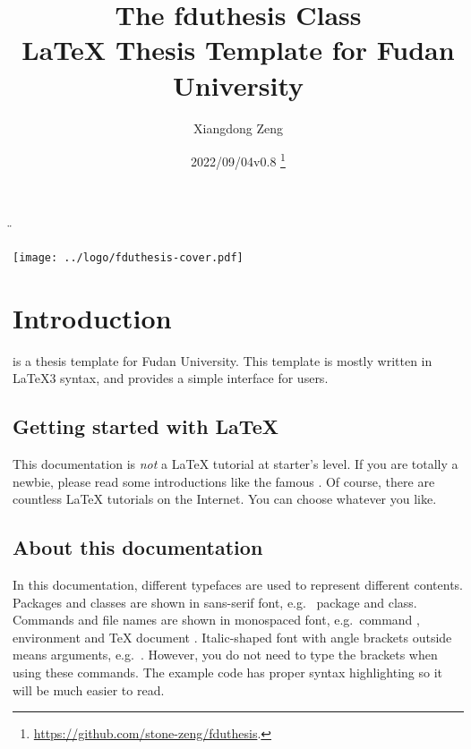 \documentclass{fdudoc}
\title{\textcolor{MaterialIndigo800}{%
  \textbf{The \textsf{fduthesis} Class \\
    \LaTeX{} Thesis Template for Fudan University}}}
\author{Xiangdong Zeng}
\date{2022/09/04\quad v0.8%
  \thanks{\url{https://github.com/stone-zeng/fduthesis}.}}
\begin{document}
\DeleteShortVerb\"


\maketitle
\vfill
\begin{center}
  \texttt{[image: ../logo/fduthesis-cover.pdf]}
\end{center}
\vfill
\thispagestyle{plain}
\clearpage

\tableofcontents


\section{Introduction}

 is a thesis template for Fudan University.
This template is mostly written in \LaTeX3 syntax, and
provides a simple interface for users.

\subsection*{Getting started with \LaTeX{}}

This documentation is \emph{not} a \LaTeX{} tutorial at
starter's level. If you are totally a newbie, please read some
introductions like the famous . Of course, there
are countless \LaTeX{} tutorials on the Internet. You can
choose whatever you like.

\subsection*{About this documentation}

In this documentation, different typefaces are used to
represent different contents. Packages and classes are shown
in sans-serif font, e.g.\  package and
 class. Commands and file names are shown in
monospaced font, e.g.\ command , environment
 and \TeX{} document .
Italic-shaped font with angle brackets outside means arguments,
e.g.\ . However, you do not need to type
the brackets when using these commands. The example code has
proper syntax highlighting so it will be much easier to read.
\end{document}
